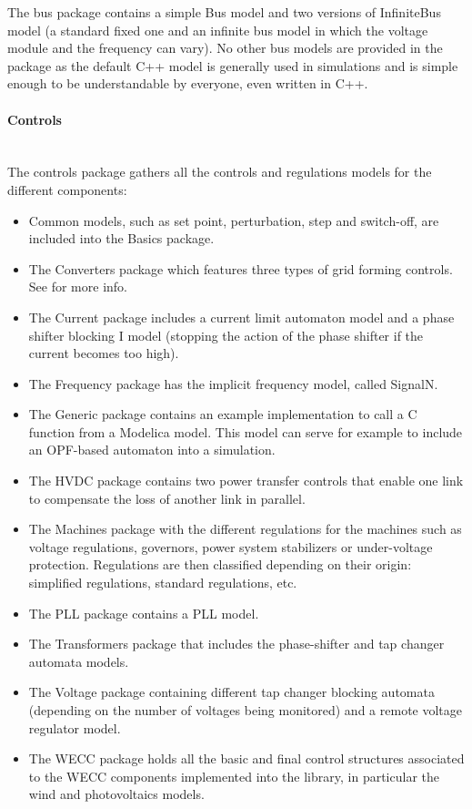 \documentclass[a4paper, 12pt]{report}
\begin{document}
The bus package contains a simple Bus model and two versions of InfiniteBus model (a standard fixed one and an infinite bus model in which the voltage module and the frequency can vary). No other bus models are provided in the package as the default C++ model is generally used in \Dynawo simulations and is simple enough to be understandable by everyone, even written in C++.

\paragraph{Controls}
~~\\

The controls package gathers all the controls and regulations models for the different components:
\begin{itemize}
\item Common models, such as set point, perturbation, step and switch-off, are included into the Basics package.
\item The Converters package which features three types of grid forming controls. See \cite{GridForming} for more info.
\item The Current package includes a current limit automaton model and a phase shifter blocking I model (stopping the action of the phase shifter if the current becomes too high).
\item The Frequency package has the implicit frequency model, called SignalN.
\item The Generic package contains an example implementation to call a C function from a Modelica model. This model can serve for example to include an OPF-based automaton into a \Dynawo simulation.
\item The HVDC package contains two power transfer controls that enable one link to compensate the loss of another link in parallel.
\item The Machines package with the different regulations for the machines such as voltage regulations, governors, power system stabilizers or under-voltage protection. Regulations are then classified depending on their origin: simplified regulations, standard regulations, etc.
\item The \ac{PLL} package contains a \ac{PLL} model.
\item The Transformers package that includes the phase-shifter and tap changer automata models.
\item The Voltage package containing different tap changer blocking automata (depending on the number of voltages being monitored) and a remote voltage regulator model.
\item The \ac{WECC} package holds all the basic and final control structures associated to the \ac{WECC} components implemented into the \Dynawo library, in particular the wind and photovoltaics models.
\end{itemize}
\end{document}
